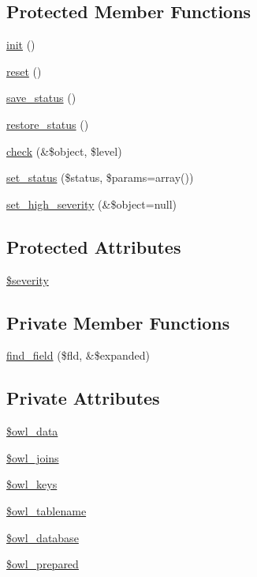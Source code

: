 \subsection*{Protected Member Functions}
\begin{DoxyCompactItemize}
\item 
\hyperlink{class__OWL_ae0ef3ded56e8a6b34b6461e5a721cd3e}{init} ()
\item 
\hyperlink{class__OWL_a2f2a042bcf31965194c03033df0edc9b}{reset} ()
\item 
\hyperlink{class__OWL_a9e49b9c76fbc021b244c6915ea536d71}{save\_\-status} ()
\item 
\hyperlink{class__OWL_a465eeaf40edd9f9c848841700c32ce55}{restore\_\-status} ()
\item 
\hyperlink{class__OWL_ad6f4f6946f40199dd0333cf219fa500e}{check} (\&\$object, \$level)
\item 
\hyperlink{class__OWL_aea912d0ede9b3c2a69b79072d94d4787}{set\_\-status} (\$status, \$params=array())
\item 
\hyperlink{class__OWL_a576829692a3b66e3d518853bf43abae3}{set\_\-high\_\-severity} (\&\$object=null)
\end{DoxyCompactItemize}
\subsection*{Protected Attributes}
\begin{DoxyCompactItemize}
\item 
\hyperlink{class__OWL_ad26b40a9dbbacb33e299b17826f8327c}{\$severity}
\end{DoxyCompactItemize}
\subsection*{Private Member Functions}
\begin{DoxyCompactItemize}
\item 
\hyperlink{classDataHandler_a1e4789e22370c96ae479bc3a58f30984}{find\_\-field} (\$fld, \&\$expanded)
\end{DoxyCompactItemize}
\subsection*{Private Attributes}
\begin{DoxyCompactItemize}
\item 
\hyperlink{classDataHandler_a329b5524c379e0db6c4d5ce59f3c414f}{\$owl\_\-data}
\item 
\hyperlink{classDataHandler_ada9b697f81ea82d269077f9c7445791d}{\$owl\_\-joins}
\item 
\hyperlink{classDataHandler_a8d398720bce975159b2d13ad7a941bc7}{\$owl\_\-keys}
\item 
\hyperlink{classDataHandler_a24620784bde262bdd02227962d3b9605}{\$owl\_\-tablename}
\item 
\hyperlink{classDataHandler_a3ac49aa018e0ebe4c74f5a636d455a8b}{\$owl\_\-database}
\item 
\hyperlink{classDataHandler_ae6093d21291ed3ab3183e11962452928}{\$owl\_\-prepared}
\end{DoxyCompactItemize}


